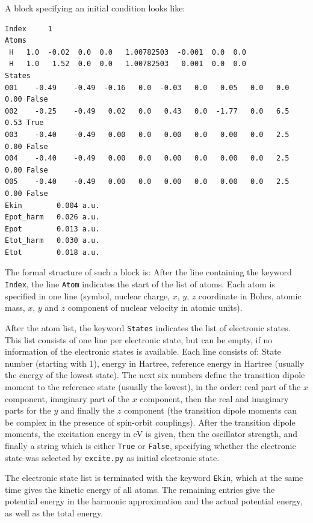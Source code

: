 \documentclass[a4paper,11pt,DIV=15,openany,twoside=false]{scrbook}
\newcommand{\ttt}[1]{\texttt{#1}}
\newenvironment{example}{
  \vspace{0mm}
  \definecolor{shadecolor}{HTML}{BBDDFF}
  \begin{shaded}
  \begin{minipage}{0.9\textwidth}
}{
  \end{minipage}
  \end{shaded}
}
\begin{document}
A block specifying an initial condition looks like:
\begin{example}
\footnotesize\begin{verbatim}
Index     1
Atoms
 H   1.0  -0.02  0.0  0.0   1.00782503  -0.001  0.0  0.0
 H   1.0   1.52  0.0  0.0   1.00782503   0.001  0.0  0.0
States
001    -0.49    -0.49  -0.16   0.0  -0.03   0.0   0.05   0.0   0.0   0.00 False
002    -0.25    -0.49   0.02   0.0   0.43   0.0  -1.77   0.0   6.5   0.53 True
003    -0.40    -0.49   0.00   0.0   0.00   0.0   0.00   0.0   2.5   0.00 False
004    -0.40    -0.49   0.00   0.0   0.00   0.0   0.00   0.0   2.5   0.00 False
005    -0.40    -0.49   0.00   0.0   0.00   0.0   0.00   0.0   2.5   0.00 False
Ekin        0.004 a.u.
Epot_harm   0.026 a.u.
Epot        0.013 a.u.
Etot_harm   0.030 a.u.
Etot        0.018 a.u.
\end{verbatim}
\end{example}
The formal structure of such a block is: After the line containing the keyword \ttt{Index}, the line \ttt{Atom} indicates the start of the list of atoms. Each atom is specified in one line (symbol, nuclear charge, $x$, $y$, $z$ coordinate in Bohrs, atomic mass, $x$, $y$ and $z$ component of nuclear velocity in atomic units). 

After the atom list, the keyword \ttt{States} indicates the list of electronic states. This list consists of one line per electronic state, but can be empty, if no information of the electronic states is available. Each line consists of: State number (starting with 1), energy in Hartree, reference energy in Hartree (usually the energy of the lowest state). The next six numbers define the transition dipole moment to the reference state (usually the lowest), in the order: real part of the $x$ component, imaginary part of the $x$ component, then the real and imaginary parts for the $y$ and finally the $z$ component (the transition dipole moments can be complex in the presence of spin-orbit couplings). After the transition dipole moments, the excitation energy in eV is given, then the oscillator strength, and finally a string which is either \ttt{True} or \ttt{False}, specifying whether the electronic state was selected by \ttt{excite.py} as initial electronic state. 

The electronic state list is terminated with the keyword \ttt{Ekin}, which at the same time gives the kinetic energy of all atoms. The remaining entries give the potential energy in the harmonic approximation and the actual potential energy, as well as the total energy.
\end{document}

